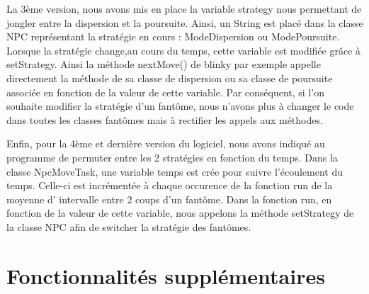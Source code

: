 \documentclass[a4paper,12pt]{report} %
\begin{document}
La 3ème version, nous avons mis en place la variable strategy nous permettant de jongler entre la dispersion et la poursuite.
Ainsi, un String est placé dans la classe NPC représentant la stratégie en cours : ModeDispersion ou ModePoursuite. Lorsque la stratégie change,au cours du temps, cette variable est modifiée grâce à setStrategy.
Ainsi la méthode nextMove() de blinky par exemple appelle directement la méthode de sa classe de dispersion ou sa classe de poursuite associée en fonction de la valeur de cette variable.
Par conséquent, si l'on souhaite modifier la stratégie d'un fantôme, nous n'avons plus à changer le code dans toutes les classes fantômes mais à rectifier les appels aux méthodes.

Enfin, pour la 4ème et dernière version du logiciel, nous avons indiqué au programme de permuter entre les 2 stratégies en fonction du temps.
Dans la classe NpcMoveTask, une variable temps est crée pour suivre l'écoulement du temps. Celle-ci est incrémentée à chaque occurence de la fonction run de la moyenne d' intervalle entre 2 coups d'un fantôme. 
Dans la fonction run, en fonction de la valeur de cette variable, nous appelons la méthode setStrategy de la classe NPC afin de switcher la stratégie des fantômes.

\section{Fonctionnalités supplémentaires}
\end{document}
